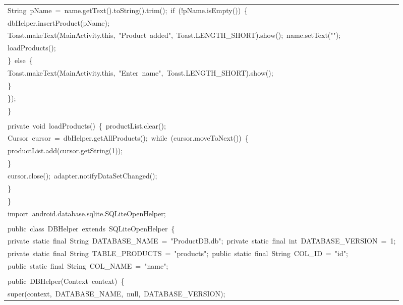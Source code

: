 \documentclass[a4paper,12pt]{article}
\begin{document}
\begin{longtable}{|p{}|}
{\ttfamily\small String\ pName\ =\ name.getText().toString().trim();\ if\ (!pName.isEmpty())\ \{} \\
{\ttfamily\small dbHelper.insertProduct(pName);} \\
{\ttfamily\small Toast.makeText(MainActivity.this,\ "Product\ added",\ Toast.LENGTH\_SHORT).show();\ name.setText("");} \\
{\ttfamily\small loadProducts();} \\
{\ttfamily\small \}\ else\ \{} \\
{\ttfamily\small Toast.makeText(MainActivity.this,\ "Enter\ name",\ Toast.LENGTH\_SHORT).show();} \\
{\ttfamily\small \}} \\
{\ttfamily\small \});} \\
{\ttfamily\small \}} \\
\strut \\
{\ttfamily\small private\ void\ loadProducts()\ \{\ productList.clear();} \\
{\ttfamily\small Cursor\ cursor\ =\ dbHelper.getAllProducts();\ while\ (cursor.moveToNext())\ \{} \\
{\ttfamily\small productList.add(cursor.getString(1));} \\
{\ttfamily\small \}} \\
{\ttfamily\small cursor.close();\ adapter.notifyDataSetChanged();} \\
{\ttfamily\small \}} \\
{\ttfamily\small \}} \\
{\ttfamily\small import\ android.database.sqlite.SQLiteOpenHelper;} \\
\strut \\
{\ttfamily\small public\ class\ DBHelper\ extends\ SQLiteOpenHelper\ \{} \\
{\ttfamily\small private\ static\ final\ String\ DATABASE\_NAME\ =\ "ProductDB.db";\ private\ static\ final\ int\ DATABASE\_VERSION\ =\ 1;} \\
{\ttfamily\small private\ static\ final\ String\ TABLE\_PRODUCTS\ =\ "products";\ public\ static\ final\ String\ COL\_ID\ =\ "id";} \\
{\ttfamily\small public\ static\ final\ String\ COL\_NAME\ =\ "name";} \\
\strut \\
{\ttfamily\small public\ DBHelper(Context\ context)\ \{} \\
{\ttfamily\small super(context,\ DATABASE\_NAME,\ null,\ DATABASE\_VERSION);} \\

\end{longtable}
\end{document}
